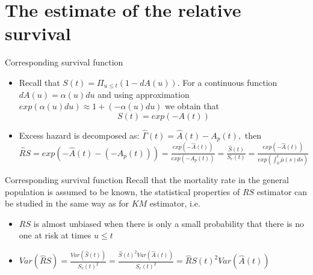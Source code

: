 \documentclass{beamer}
\begin{document}
\section{The estimate of the relative survival}
\begin{frame}{Corresponding survival function}
\begin{itemize}
\item Recall that
$S(t) = \Pi_{u \leq t}(1-dA(u))$.
\newline
For a continuous function $dA(u) = \alpha(u)du$ and using approximation $exp(\alpha(u)du) \approx 1+ (-\alpha(u)du)$ we obtain that 
$$S(t) = exp(-A(t))$$
\item Excess hazard is decomposed as: $\hat\Gamma(t) = \hat A(t) - A_p(t),$ then 
\newline
$\hat RS = exp(-\hat A(t) - (-A_p(t))) = \frac{exp(-\hat A(t))}{exp(-A_p(t))} = \frac{\hat S(t)}{S_e(t)} =\frac{exp(-\hat A(t))}{exp(\int_0^t \bar \mu (s) ds)} $ 
\end{itemize}
\end{frame}

\begin{frame}{Corresponding survival function}
Recall that the mortality rate in the general population is assumed to be known, the statistical properties of $RS$ estimator can be studied in the same way as for $KM$ estimator, i.e.
\begin{itemize}
    \item $RS$ is almost unbiased when there is only a small probability that there is no one at risk at times $u \leq t$
    \item $Var(\hat RS) = \frac{Var(\hat S(t))}{S_e(t)^2}  = \frac{\hat S(t)^2 Var(\hat A(t))}{S_e(t)^2} = \hat RS(t)^2  Var(\hat A(t))$
\end{itemize}

\end{frame}
\end{document}
